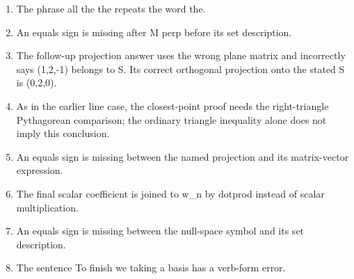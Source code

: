 \begin{enumerate}
\item The phrase all the the repeats the word the.
\item An equals sign is missing after M perp before its set description.
\item The follow-up projection answer uses the wrong plane matrix and incorrectly says (1,2,-1) belongs to S. Its correct orthogonal projection onto the stated S is (0,2,0).
\item As in the earlier line case, the closest-point proof needs the right-triangle Pythagorean comparison; the ordinary triangle inequality alone does not imply this conclusion.
\item An equals sign is missing between the named projection and its matrix-vector expression.
\item The final scalar coefficient is joined to w\_n by dotprod instead of scalar multiplication.
\item An equals sign is missing between the null-space symbol and its set description.
\item The sentence To finish we taking a basis has a verb-form error.
\end{enumerate}
